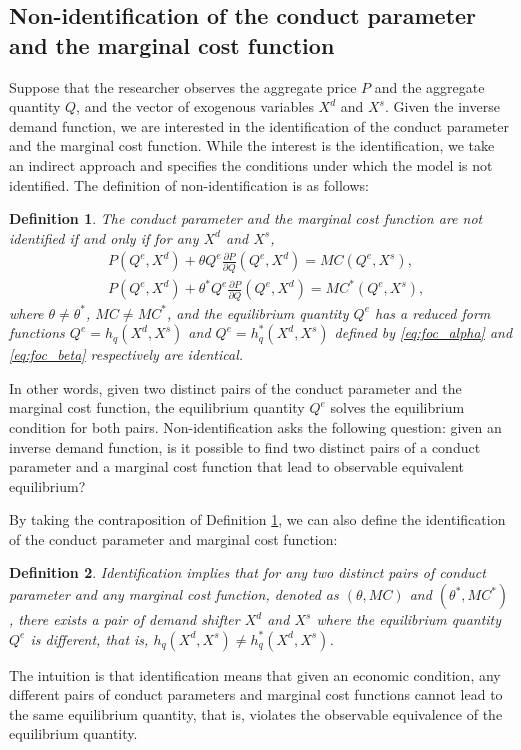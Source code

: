 \documentclass[11pt, a4paper]{article}
\newtheorem{definition}{Definition}
\theoremstyle{remark}
\begin{document}
\subsection{Non-identification of the conduct parameter and the marginal cost function}\label{sec:definition_identification}
Suppose that the researcher observes the aggregate price $P$ and the aggregate quantity $Q$, and the vector of exogenous variables $X^{d}$ and $X^{s}$.
Given the inverse demand function, we are interested in the identification of the conduct parameter and the marginal cost function.
While the interest is the identification, we take an indirect approach and specifies the conditions under which the model is not identified.
The definition of non-identification is as follows:
\begin{definition}\label{definition:non_identification}
    The conduct parameter and the marginal cost function are not identified if and only if for any $X^{d}$ and $X^{s}$,
    \begin{align}
    & P(Q^e, X^{d}) + \theta Q^e\frac{\partial P}{\partial Q}(Q^e, X^{d}) = MC(Q^e, X^{s}) ,  \label{eq:foc_alpha}\\
    & P(Q^e, X^{d}) + \theta^{*} Q^e\frac{\partial P}{\partial Q}(Q^e, X^{d}) = MC^{*}(Q^e, X^{s}),\label{eq:foc_beta}
    \end{align}
    where $\theta \neq \theta^{*}$, $MC \ne MC^{*}$, and the equilibrium quantity $Q^e$ has a reduced form functions $Q^e = h_q(X^{d}, X^{s})$ and $Q^e = h_q^{*}(X^{d}, X^{s})$ defined by \eqref{eq:foc_alpha} and \eqref{eq:foc_beta} respectively are identical.
\end{definition}
In other words, given two distinct pairs of the conduct parameter and the marginal cost function, the equilibrium quantity $Q^e$ solves the equilibrium condition for both pairs.
Non-identification asks the following question: given an inverse demand function, is it possible to find two distinct pairs of a conduct parameter and a marginal cost function that lead to observable equivalent equilibrium?


By taking the contraposition of Definition \ref{definition:non_identification}, we can also define the identification of the conduct parameter and marginal cost function:
\begin{definition}\label{definition:identification}
    Identification implies that for any two distinct pairs of conduct parameter and any marginal cost function, denoted as $(\theta, MC)$ and $(\theta^{*}, MC^{*})$, there exists a pair of demand shifter $X^{d}$ and $X^{s}$ where the equilibrium quantity $Q^e$ is different, that is, $h_q(X^{d}, X^{s}) \ne h_q^{*}(X^{d}, X^{s})$.
\end{definition}
The intuition is that identification means that given an economic condition, any different pairs of conduct parameters and marginal cost functions cannot lead to the same equilibrium quantity, that is, violates the observable equivalence of the equilibrium quantity.
\end{document}
